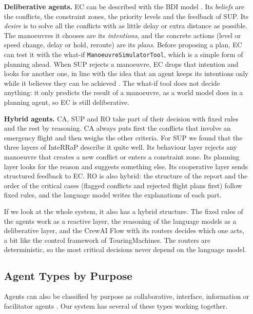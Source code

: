 \textbf{Deliberative agents.} EC can be described with the BDI model \cite{bratman1987}.
Its \emph{beliefs} are the conflicts, the constraint zones, the priority levels and the
feedback of SUP. Its \emph{desire} is to solve all the conflicts with as little delay or
extra distance as possible. The manoeuvres it chooses are its \emph{intentions}, and the
concrete actions (level or speed change, delay or hold, reroute) are its \emph{plans}.
Before proposing a plan, EC can test it with the what-if \texttt{ManoeuvreSimulatorTool},
which is a simple form of planning ahead. When SUP rejects a manoeuvre, EC drops that
intention and looks for another one, in line with the idea that an agent keeps its
intentions only while it believes they can be achieved \cite{cohen1990}. The what-if tool
does not decide anything: it only predicts the result of a manoeuvre, as a world model does
in a planning agent, so EC is still deliberative.

\textbf{Hybrid agents.} CA, SUP and RO take part of their decision with fixed rules and the
rest by reasoning. CA always puts first the conflicts that involve an emergency flight and
then weighs the other criteria. For SUP we found that the
three layers of InteRRaP \cite{muller1996} describe it quite well. Its behaviour layer
rejects any manoeuvre that creates a new conflict or enters a constraint zone. Its
planning layer looks for the reason and suggests something else. Its cooperative layer
sends structured feedback to EC. RO is also hybrid: the structure of the report and the
order of the critical cases (flagged conflicts and rejected flight plans first) follow fixed rules, and the language
model writes the explanations of each part.

If we look at the whole system, it also has a hybrid structure. The fixed rules of the
agents work as a reactive layer, the reasoning of the language models as a deliberative
layer, and the CrewAI Flow with its routers decides which one acts, a bit like the control
framework of TouringMachines. The routers are deterministic, so the most critical decisions
never depend on the language model.

\subsection{Agent Types by Purpose}
\label{sec:types}

Agents can also be classified by purpose as collaborative, interface, information or
facilitator agents \cite{lecture3}. Our system has several of these types
working together.

